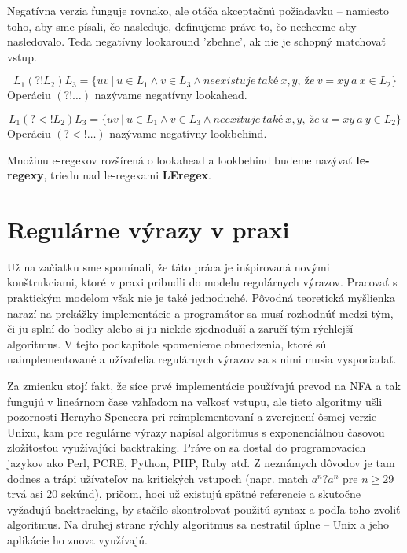 Negatívna verzia funguje rovnako, ale otáča akceptačnú požiadavku -- namiesto toho, aby sme písali, čo nasleduje, definujeme práve to, čo nechceme aby nasledovalo. Teda negatívny lookaround 'zbehne', ak nie je schopný matchovať vstup.

\begin{df}
$$ L_{1}(?!L_{2})L_{3} = \lbrace uv ~|~ u \in L_{1} \land v \in L_{3} \land neexistuje~také~x,y,~že~v=xy~a~x \in L_2 \rbrace $$ Operáciu $(?!\dots)$ nazývame negatívny lookahead.
\end{df}

\begin{df}
$$ L_{1}(?<!L_{2})L_{3} = \lbrace uv ~|~ u \in L_{1} \land v \in L_{3} \land neexituje~také~x,y,~že~u=xy~a~y \in L_2 \rbrace $$ Operáciu $(?<!\dots)$ nazývame negatívny lookbehind.
\end{df}

\begin{df}
Množinu e-regexov rozšírená o lookahead a lookbehind budeme nazývať \textbf{le-regexy}, triedu nad le-regexami \textbf{LEregex}.
\end{df}

\section{Regulárne výrazy v praxi}
\label{prax}

Už na začiatku sme spomínali, že táto práca je inšpirovaná novými konštrukciami, ktoré v praxi pribudli do modelu regulárnych výrazov. Pracovať s praktickým modelom však nie je také jednoduché. Pôvodná teoretická myšlienka narazí na prekážky implementácie a programátor sa musí rozhodnúť medzi tým, či ju splní do bodky alebo si ju niekde zjednoduší a zaručí tým rýchlejší algoritmus. V tejto podkapitole spomenieme obmedzenia, ktoré sú naimplementované a užívatelia regulárnych výrazov sa s nimi musia vysporiadať.

Za zmienku stojí fakt, že síce prvé implementácie používajú prevod na NFA a tak fungujú v lineárnom čase vzhľadom na veľkosť vstupu, ale tieto algoritmy ušli pozornosti Hernyho Spencera pri reimplementovaní a zverejnení ôsmej verzie Unixu, kam pre regulárne výrazy napísal algoritmus s exponenciálnou časovou zložitosťou využívajúci backtraking. Práve on sa dostal do programovacích jazykov ako Perl, PCRE, Python, PHP, Ruby atď. Z neznámych dôvodov je tam dodnes a trápi užívateľov na kritických vstupoch (napr. match $a^n?a^n$ pre $n \geq 29$ trvá asi 20 sekúnd), pričom, hoci už existujú spätné referencie a skutočne vyžadujú backtracking, by stačilo skontrolovať použitú syntax a podľa toho zvoliť algoritmus. Na druhej strane rýchly algoritmus sa nestratil úplne -- Unix a jeho aplikácie ho znova využívajú.

